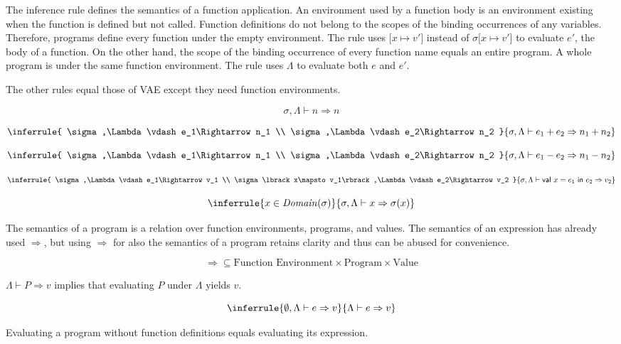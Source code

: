 The inference rule defines the semantics of a function application. An
environment used by a function body is an environment existing when the function
is defined but not called. Function definitions do not belong to the scopes of
the binding occurrences of any variables. Therefore, programs define every
function under the empty environment. The rule uses \(\lbrack x\mapsto
v'\rbrack\) instead of \(\sigma\lbrack x\mapsto v'\rbrack\) to evaluate \(e'\),
the body of a function. On the other hand, the scope of the binding occurrence of
every function name equals an entire program. A whole program is under the same
function environment. The rule uses \(\Lambda\) to evaluate both \(e\) and
\(e'\).

The other rules equal those of VAE except they need function environments.

\[
\sigma,\Lambda\vdash n\Rightarrow n
\]

\[
\inferrule
{ \sigma,\Lambda\vdash e_1\Rightarrow n_1 \\ \sigma,\Lambda\vdash
e_2\Rightarrow n_2 }
{ \sigma,\Lambda\vdash e_1+e_2\Rightarrow n_1+n_2 }
\]

\[
\inferrule
{ \sigma,\Lambda\vdash e_1\Rightarrow n_1 \\ \sigma,\Lambda\vdash
e_2\Rightarrow n_2 }
{ \sigma,\Lambda\vdash e_1-e_2\Rightarrow n_1-n_2 }
\]

\[
\inferrule
{
  \sigma,\Lambda\vdash e_1\Rightarrow v_1 \\
  \sigma\lbrack x\mapsto v_1\rbrack,\Lambda\vdash e_2\Rightarrow v_2
}
{ \sigma,\Lambda\vdash \textsf{val}\ x=e_1\ \textsf{in}\ e_2\Rightarrow v_2 }
\]

\[
\inferrule
{ x\in\mathit{Domain}(\sigma) }
{ \sigma,\Lambda\vdash x\Rightarrow \sigma(x)}
\]

The semantics of a program is a relation over function environments, programs,
and values. The semantics of an expression has already used \(\Rightarrow\), but
using \(\Rightarrow\) for also the semantics of a program retains clarity and
thus can be abused for convenience.

\[\Rightarrow\subseteq\text{Function
Environment}\times\text{Program}\times\text{Value}\]

\(\Lambda\vdash P\Rightarrow v\) implies that evaluating \(P\) under \(\Lambda\)
yields \(v\).

\[
\inferrule
{ \emptyset,\Lambda\vdash e\Rightarrow v }
{ \Lambda\vdash e\Rightarrow v }
\]

Evaluating a program without function definitions equals evaluating its
expression.

